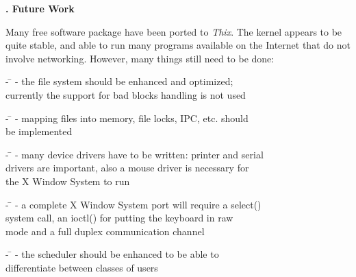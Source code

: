 \begin{slide}{}


{\small \bf {}. Future Work\\
}

\vspace{2cm}
{\tiny Many free software package have been ported to {\em Thix}.  The
kernel appears to be quite stable, and able to run many programs
available on the Internet that do not involve networking.  However,
many things still need to be done:

\vspace{1cm}


\begin{tabbing}
\hspace{1cm} - \= \kill
\hspace{1cm} - the file system should be enhanced and optimized;\\
\> currently the support for bad blocks handling is not used
\end{tabbing}

\begin{tabbing}
\hspace{1cm} - \= \kill
\hspace{1cm} - mapping files into memory, file locks, IPC, etc. should\\
\> be implemented
\end{tabbing}

\begin{tabbing}
\hspace{1cm} - \= \kill
\hspace{1cm} - many device drivers have to be written: printer and serial\\
\> drivers are important, also a mouse driver is necessary for\\
\> the X Window System to run
\end{tabbing}

\begin{tabbing}
\hspace{1cm} - \= \kill
\hspace{1cm} - a complete X Window System port will require a select()\\
\> system call, an ioctl() for putting the keyboard in raw\\
\> mode and a full duplex communication channel
\end{tabbing}

\begin{tabbing}
\hspace{1cm} - \= \kill
\hspace{1cm} - the scheduler should be enhanced to be able to\\
\> differentiate between classes of users
\end{tabbing}

}
\end{slide}
